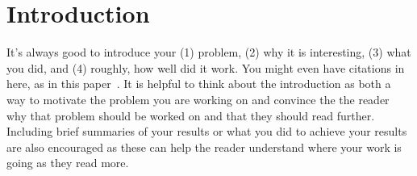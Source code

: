\chapter{Introduction}
\label{chap:intro}

It's always good to introduce your (1) problem, (2) why it is interesting, (3) what you did, and (4) roughly, how well did it work. You might even have citations in here, as in this paper~\cite{Asawa:2008:TDT}.  It is helpful to think about the introduction as both a way to motivate the problem you are working on and convince the the reader why that problem should be worked on and that they should read further. Including brief summaries of your results or what you did to achieve your results are also encouraged as these can help the reader understand where your work is going as they read more.
